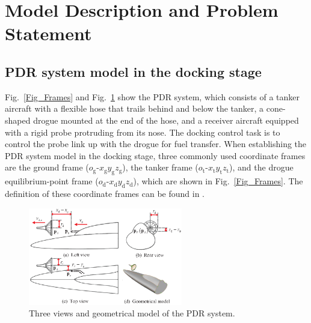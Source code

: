 \section{Model Description and Problem Statement}

\label{ProbelmF}

\subsection{PDR system model in the docking stage}

Fig.~\ref{Fig_Frames} and Fig.~\ref{Fig_3Views} show the PDR system, which
consists of a tanker aircraft with a flexible hose that trails behind and
below the tanker, a cone-shaped drogue mounted at the end of the hose, and a
receiver aircraft equipped with a rigid probe protruding from its nose. The
docking control task is to control the probe link up with the drogue for fuel
transfer. When establishing the PDR system model in the docking stage, three
commonly used coordinate frames are the ground frame ($o_{\text{g}}%
$-$x_{\text{g}}y_{\text{g}}z_{\text{g}}$), the tanker frame ($o_{\text{t}}%
$-$x_{\text{t}}y_{\text{t}}z_{\text{t}}$), and the drogue equilibrium-point
frame ($o_{\text{d}}$-$x_{\text{d}}y_{\text{d}}z_{\text{d}}$), which are shown
in Fig.~\ref{Fig_Frames}. The definition of these coordinate frames can be
found in \cite{wei2016drogue}.
\begin{figure}[pth]
	\begin{centering}
		\includegraphics[width=0.6\textwidth]{Figures/Figs_Ch10/3Views} 
		\par \end{centering}
	\caption{Three views and geometrical model of the PDR system.}%
	\label{Fig_3Views}%
\end{figure}

